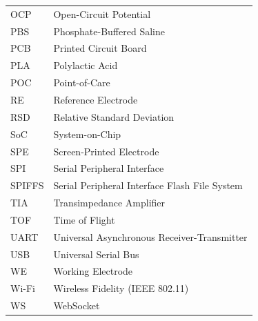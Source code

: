 \begin{longtable}{@{}p{3.5cm}p{10cm}@{}}
OCP    & Open-Circuit Potential \\
PBS    & Phosphate-Buffered Saline \\
PCB    & Printed Circuit Board \\
PLA    & Polylactic Acid \\
POC    & Point-of-Care \\
RE     & Reference Electrode \\
RSD    & Relative Standard Deviation \\
SoC    & System-on-Chip \\
SPE    & Screen-Printed Electrode \\
SPI    & Serial Peripheral Interface \\
SPIFFS & Serial Peripheral Interface Flash File System \\
TIA    & Transimpedance Amplifier \\
TOF    & Time of Flight \\
UART   & Universal Asynchronous Receiver-Transmitter \\
USB    & Universal Serial Bus \\
WE     & Working Electrode \\
Wi-Fi  & Wireless Fidelity (IEEE 802.11) \\
WS     & WebSocket \\

\end{longtable}
